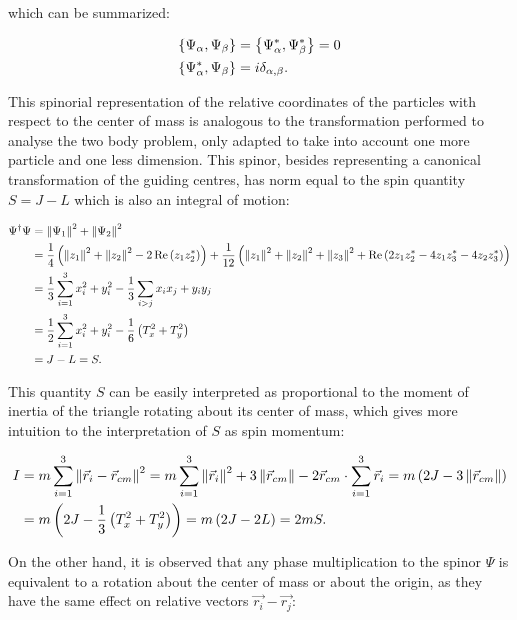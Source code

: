which can be summarized:

\begin{align}
\left\lbrace \Psi_\alpha, \Psi_\beta \right\rbrace &= \left\lbrace \Psi_\alpha^*, \Psi_\beta^* \right\rbrace = 0\\
\left\lbrace \Psi_\alpha^*, \Psi_\beta \right\rbrace &= i\delta_{\alpha,\beta}.
\label{eq:canonicalSpinor}
\end{align}

This spinorial representation of the relative coordinates of the particles with respect to the center of mass is analogous to the transformation performed to analyse the two body problem, only adapted to take into account one more particle and one less dimension. This spinor, besides representing a canonical transformation of the guiding centres, has norm equal to the spin quantity $S = J-L$ which is also an integral of motion:

\small
\begin{align*}
\Psi^\dagger\Psi &= \left\lVert \Psi_1 \right\rVert^2 + \left\lVert \Psi_2 \right\rVert^2 \\
&= \frac{1}{4}\left( \left\lVert z_1 \right\rVert^2 + \left\lVert z_2 \right\rVert^2 - 2\operatorname{Re}\left( z_1z_2^* \right) \right) + \frac{1}{12}\left( \left\lVert z_1 \right\rVert^2 + \left\lVert z_2 \right\rVert^2+ \left\lVert z_3 \right\rVert^2 + \operatorname{Re}\left( 2z_1z_2^*- 4z_1z_3^*- 4z_2z_3^* \right) \right)\\
&= \frac{1}{3}\sum_{i=1}^3 x_i^2 + y_i^2 -\frac{1}{3}\sum_{i > j} x_ix_j + y_iy_j\\
&= \frac{1}{2}\sum_{i=1}^3 x_i^2 + y_i^2 - \frac{1}{6}\left( T_x^2+T_y^2 \right)\\
&= J-L = S.
\end{align*}
\normalsize

This quantity $S$ can be easily interpreted as proportional to the moment of inertia of the triangle rotating about its center of mass, which gives more intuition to the interpretation of $S$ as spin momentum:

\begin{align*}
I &= m\sum_{i=1}^3 \left\lVert \vec{r}_i - \vec{r}_{cm} \right\rVert^2 = m\sum_{i=1}^3 \left\lVert \vec{r}_i \right\rVert^2 + 3\left\lVert \vec{r}_{cm} \right\rVert - 2\vec{r}_{cm}\cdot\sum_{i=1}^3\vec{r}_i =m\left( 2J -3\left\lVert \vec{r}_{cm} \right\rVert \right)\\
&= m\left( 2J - \frac{1}{3}\left( T_x^2+T_y^2 \right) \right) = m\left( 2J-2L \right) = 2mS.
\end{align*}

On the other hand, it is observed that any phase multiplication to the spinor $\Psi$ is equivalent to a rotation about the center of mass or about the origin, as they have the same effect on relative vectors $\vec{r_i}-\vec{r_j}$:

